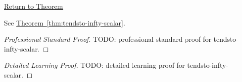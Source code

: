 \newpage
{}
\label{prf:tendsto-infty-scalar}

\begin{remark*}[Return]
\hyperref[thm:tendsto-infty-scalar]{Return to Theorem}
\end{remark*}

\begin{theorem*}
See \hyperref[thm:tendsto-infty-scalar]{Theorem~\ref*{thm:tendsto-infty-scalar}}.
\end{theorem*}

\begin{proof}[Professional Standard Proof]
\LRAProofBodyStart
TODO: professional standard proof for tendsto-infty-scalar.
\end{proof}

\begin{proof}[Detailed Learning Proof]
\LRAProofBodyStart
TODO: detailed learning proof for tendsto-infty-scalar.
\end{proof}

\begin{remark*}
\end{remark*}

\begin{dependencies}
\NoLocalDependencies
\end{dependencies}

\clearpage
